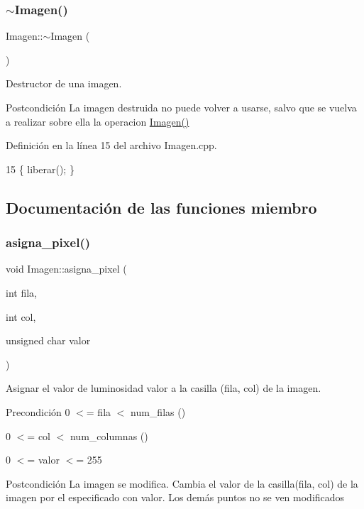 \subsubsection{\texorpdfstring{$\sim$\+Imagen()}{~Imagen()}}
{\footnotesize\ttfamily Imagen\+::$\sim$\+Imagen (\begin{DoxyParamCaption}{ }\end{DoxyParamCaption})}



Destructor de una imagen. 

\begin{DoxyPostcond}{Postcondición}
La imagen destruida no puede volver a usarse, salvo que se vuelva a realizar sobre ella la operacion \hyperlink{classImagen_ab2e649aa7a105155c7bfdb846abf0528}{Imagen()} 
\end{DoxyPostcond}


Definición en la línea 15 del archivo Imagen.\+cpp.


\begin{DoxyCode}
15 \{ liberar(); \}
\end{DoxyCode}


\subsection{Documentación de las funciones miembro}
\mbox{\label{classImagen_abe7e36244d80a6ed5ebf952c557203d3}} 
\subsubsection{\texorpdfstring{asigna\+\_\+pixel()}{asigna\_pixel()}}
{\footnotesize\ttfamily void Imagen\+::asigna\+\_\+pixel (\begin{DoxyParamCaption}\item[{int}]{fila,  }\item[{int}]{col,  }\item[{unsigned char}]{valor }\end{DoxyParamCaption})}



Asignar el valor de luminosidad valor a la casilla (fila, col) de la imagen. 

\begin{DoxyPrecond}{Precondición}
0 $<$= fila $<$ num\+\_\+filas () 

0 $<$= col $<$ num\+\_\+columnas () 

0 $<$= valor $<$= 255 
\end{DoxyPrecond}
\begin{DoxyPostcond}{Postcondición}
La imagen se modifica. Cambia el valor de la casilla(fila, col) de la imagen por el especificado con valor. Los demás puntos no se ven modificados 
\end{DoxyPostcond}


